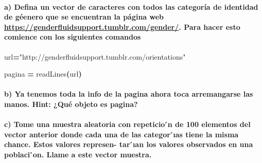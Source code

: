 \documentclass[
]{article}
\newenvironment{Shaded}{\begin{snugshade}}{\end{snugshade}}
\newcommand{\NormalTok}[1]{#1}
\newcommand{\OperatorTok}[1]{\textcolor[rgb]{0.81,0.36,0.00}{\textbf{#1}}}
\newcommand{\StringTok}[1]{\textcolor[rgb]{0.31,0.60,0.02}{#1}}
\begin{document}
\hypertarget{a-defina-un-vector-de-caracteres-con-todos-las-categoruxeda-de-identidad-de-guxe9enero-que-se-encuentran-la-puxe1gina-web-httpsgenderfluidsupport.tumblr.comgender.-para-hacer-esto-comience-con-los-siguientes-comandos}{%
\paragraph{\texorpdfstring{a) Defina un vector de caracteres con todos
las categoría de identidad de géenero que se encuentran la página web
\url{https://genderfluidsupport.tumblr.com/gender/}. Para hacer esto
comience con los siguientes
comandos}{a) Defina un vector de caracteres con todos las categoría de identidad de géenero que se encuentran la página web https://genderfluidsupport.tumblr.com/gender/. Para hacer esto comience con los siguientes comandos}}\label{a-defina-un-vector-de-caracteres-con-todos-las-categoruxeda-de-identidad-de-guxe9enero-que-se-encuentran-la-puxe1gina-web-httpsgenderfluidsupport.tumblr.comgender.-para-hacer-esto-comience-con-los-siguientes-comandos}}

\begin{Shaded}
\begin{Highlighting}[]
\NormalTok{ url}\OperatorTok{=}\StringTok{"http://genderfluidsupport.tumblr.com/orientations"}
 
\NormalTok{ pagina }\OperatorTok{=}\NormalTok{ readLines}\OperatorTok{(}\NormalTok{url}\OperatorTok{)} 
\end{Highlighting}
\end{Shaded}

\hypertarget{b-ya-tenemos-toda-la-info-de-la-pagina-ahora-toca-arremangarse-las-manos.-hint-quuxe9-objeto-es-pagina}{%
\paragraph{b) Ya tenemos toda la info de la pagina ahora toca
arremangarse las manos. Hint: ¿Qué objeto es
pagina?}\label{b-ya-tenemos-toda-la-info-de-la-pagina-ahora-toca-arremangarse-las-manos.-hint-quuxe9-objeto-es-pagina}}

\hypertarget{c-tome-una-muestra-aleatoria-con-repeticio-n-de-100-elementos-del-vector-anterior-donde-cada-una-de-las-categor-ux131as-tiene-la-misma-chance.-estos-valores-represen--tar-ux131an-los-valores-observados-en-una-poblaci-on.-llame-a-este-vector-muestra.}{%
\paragraph{c) Tome una muestra aleatoria con repeticio ́n de 100
elementos del vector anterior donde cada una de las categor ́ıas tiene
la misma chance. Estos valores represen- tar ́ıan los valores observados
en una poblaci ́on. Llame a este vector
muestra.}\label{c-tome-una-muestra-aleatoria-con-repeticio-n-de-100-elementos-del-vector-anterior-donde-cada-una-de-las-categor-ux131as-tiene-la-misma-chance.-estos-valores-represen--tar-ux131an-los-valores-observados-en-una-poblaci-on.-llame-a-este-vector-muestra.}}
\end{document}
